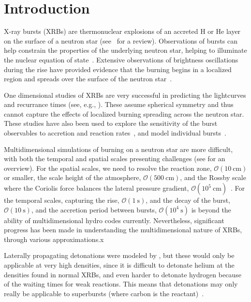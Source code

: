 \documentclass[preprint,times,tighten]{aastex63}
\begin{document}
\section{Introduction}\label{Sec:Introduction}

X-ray bursts (XRBs) are thermonuclear explosions of an accreted H or
He layer on the surface of a neutron star (see~\citealt{galloway:2017}
for a review).  Observations of bursts can help constrain the
properties of the underlying neutron star, helping to illuminate the
nuclear equation of state~\citep{steiner:2010,ozel2016masses}.  Extensive
observations of brightness oscillations during the rise have provided
evidence that the burning begins in a localized region and spreads
over the surface of the neutron
star~\citep{bhattacharyya:2006,bhattacharyya:2007,chakraborty:2014}.

One dimensional studies of XRBs are very successful in predicting the
lightcurves and recurrance times (see, e.g., \citealt{woosley-xrb}).
These assume spherical symmetry and thus cannot capture the effects of
localized burning spreading across the neutron star.  These studies
have also been used to explore the sensitivity of the burst
observables to accretion and reaction
rates~\citep{cyburt:2010,Jose2010a,Lampe2016}, and model individual
bursts~\citep{johnston:2019}.

Multidimensional simulations of burning on a neutron star are more
difficult, with both the temporal and spatial scales presenting
challenges (see \citealt{astronum_2018} for an overview).  For the spatial scales, we need to
resolve the reaction zone, $\mathcal{O}(10~\mbox{cm})$ or smaller, the
scale height of the atmosphere, $\mathcal{O}(500~\mbox{cm})$, and the
Rossby scale where the Coriolis force balances the lateral pressure
gradient, $\mathcal{O}(10^5~\mbox{cm})$~\citep{spitkovsky2002}.  For
the temporal scales, capturing the rise, $\mathcal{O}(1~\mbox{s})$,
and the decay of the burst, $\mathcal{O}(10~\mbox{s})$, and the
accretion period between bursts, $\mathcal{O}(10^4~\mbox{s})$ is
beyond the ability of multidimensional hydro codes currently.
Nevertheless, significant progress has been made in understanding the
multidimensional nature of XRBs, through various approximations.x

Laterally propagating detonations were modeled by
\citet{fryxellwoosley82,hedet}, but these would only be applicable at
very high densities, since it is difficult to detonate helium at the
densities found in normal XRBs, and even harder to detonate hydrogen
because of the waiting times for weak reactions.  This means that
detonations may only really be applicable to superbursts (where carbon
is the reactant)~\citep{Weinberg2006b,Weinberg2007}.
\end{document}
